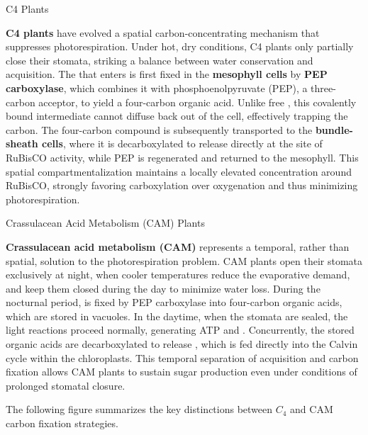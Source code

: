 \documentclass[10pt]{article}
\begin{document}
    \begin{core}{C4 Plants}

      \textbf{C4 plants} have evolved a spatial carbon-concentrating mechanism that suppresses photorespiration. Under hot, dry conditions, C4 plants only partially close their stomata, striking a balance between water conservation and  acquisition. The  that enters is first fixed in the \textbf{mesophyll cells} by \textbf{PEP carboxylase}, which combines it with phosphoenolpyruvate (PEP), a three-carbon acceptor, to yield a four-carbon organic acid. Unlike free , this covalently bound intermediate cannot diffuse back out of the cell, effectively trapping the carbon. The four-carbon compound is subsequently transported to the \textbf{bundle-sheath cells}, where it is decarboxylated to release  directly at the site of RuBisCO activity, while PEP is regenerated and returned to the mesophyll. This spatial compartmentalization maintains a locally elevated  concentration around RuBisCO, strongly favoring carboxylation over oxygenation and thus minimizing photorespiration.


    \end{core}

    \begin{core}{Crassulacean Acid Metabolism (CAM) Plants}

      \textbf{Crassulacean acid metabolism (CAM)} represents a temporal, rather than spatial, solution to the photorespiration problem. CAM plants open their stomata exclusively at night, when cooler temperatures reduce the evaporative demand, and keep them closed during the day to minimize water loss. During the nocturnal period,  is fixed by PEP carboxylase into four-carbon organic acids, which are stored in vacuoles. In the daytime, when the stomata are sealed, the light reactions proceed normally, generating ATP and . Concurrently, the stored organic acids are decarboxylated to release , which is fed directly into the Calvin cycle within the chloroplasts. This temporal separation of  acquisition and carbon fixation allows CAM plants to sustain sugar production even under conditions of prolonged stomatal closure.

      The following figure summarizes the key distinctions between $C_4$ and CAM carbon fixation strategies.


    \end{core}
\end{document}
